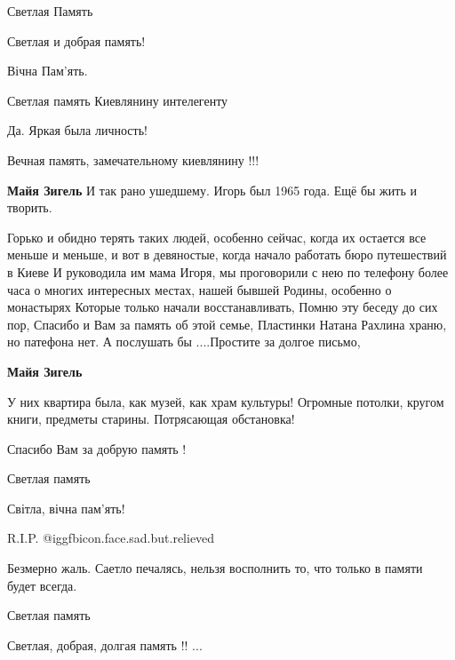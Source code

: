  
 
 
 
 

Светлая Память

Светлая и добрая память!

Вічна Пам'ять.

Светлая память Киевлянину интелегенту

Да. Яркая была личность!

Вечная память, замечательному киевлянину !!!

\begin{itemize} %
\textbf{Майя Зигель} И так рано ушедшему. Игорь был 1965 года. Ещё бы жить и творить.


Горько и обидно терять таких людей, особенно сейчас, когда их остается все
меньше и меньше, и вот в девяностые, когда начало работать бюро путешествий в
Киеве И руководила им мама Игоря, мы проговорили с нею по телефону более часа
о многих интересных местах, нашей бывшей Родины, особенно о монастырях Которые
только начали восстанавливать, Помню эту беседу до сих пор, Спасибо и Вам за
память об этой семье, Пластинки Натана Рахлина храню, но патефона нет. А
послушать бы ....Простите за долгое письмо,

\textbf{Майя Зигель} 

У них квартира была, как музей, как храм культуры! Огромные потолки, кругом
книги, предметы старины. Потрясающая обстановка!

Спасибо Вам за добрую память !

\end{itemize} %

Светлая память

Світла, вічна пам'ять!

R.I.P.  @igg{fbicon.face.sad.but.relieved} 

Безмерно жаль. Саетло печалясь, нельзя восполнить то, что только в памяти будет всегда.

Светлая память

Светлая, добрая, долгая память !! ...
